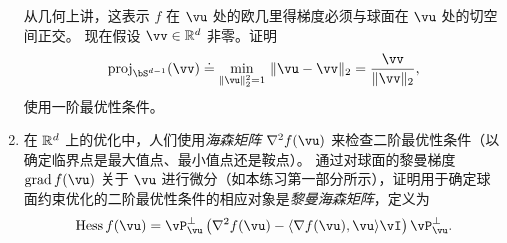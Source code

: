 \documentclass[../../book-main.tex]{subfiles}
\begin{document}
\begin{exercise}
\begin{enumerate}
        从几何上讲，这表示 $f$ 在 $\vu$ 处的欧几里得梯度必须与球面在 $\vu$ 处的切空间正交。
        现在假设 $\vv \in \R^d$ 非零。证明
        \begin{equation*}
            \mathrm{proj}_{\bS^{d-1}}(\vv) \doteq
            \min_{\norm{\vu}_2^2 = 1}\, \norm{\vu - \vv}_2 
            =
            \frac{\vv}{\norm{\vv}_2},
        \end{equation*}
        使用一阶最优性条件。
        \item 在 $\mathbb{R}^d$ 上的优化中，人们使用\textit{海森矩阵} $\nabla^2 f(\vu)$ 来检查二阶最优性条件（以确定临界点是最大值点、最小值点还是鞍点）。
        通过对球面的黎曼梯度 $\mathrm{grad}\, f(\vu)$ 关于 $\vu$ 进行微分（如本练习第一部分所示），证明用于确定球面约束优化的二阶最优性条件的相应对象是\textit{黎曼海森矩阵}，定义为
        \begin{equation}\label{eq:exercise-riemann-hess-sphere}
            \mathrm{Hess}\, f(\vu) = \vP_{\vu}^\perp \left( 
            \nabla^2 f(\vu) - \ip{\nabla f(\vu)}{\vu} \vI
            \right) \vP_{\vu}^\perp.
        \end{equation}
    \end{enumerate}
\end{exercise}
\end{document}
